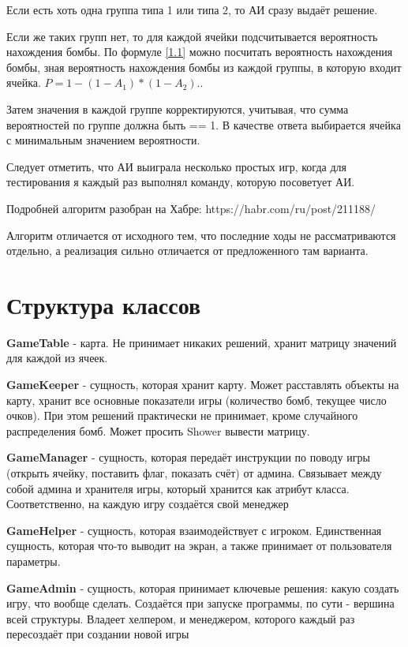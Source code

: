 \documentclass[a4paper,14pt, unknownkeysallowed]{extreport}
\begin{document}
Если есть хоть одна группа типа 1 или типа 2, то АИ сразу выдаёт решение.

Если же таких групп нет, то для каждой ячейки подсчитывается вероятность нахождения бомбы.
По формуле \ref{1.1} можно посчитать вероятность нахождения бомбы, зная вероятность нахождения бомбы из каждой группы, в которую входит ячейка.
\begin{math}
	\label{1.1}
	P = 1 - (1 - A_1) * (1 - A_2)..
\end{math}

Затем значения в каждой группе корректируются, учитывая, что сумма вероятностей по группе должна быть == 1.
В качестве ответа выбирается ячейка с минимальным значением вероятности.

Следует отметить, что АИ выиграла несколько простых игр, когда для тестирования я каждый раз выполнял команду, которую посоветует АИ.

Подробней алгоритм разобран на Хабре: https://habr.com/ru/post/211188/

Алгоритм отличается от исходного тем, что последние ходы не рассматриваются отдельно, а реализация сильно отличается от предложенного там варианта. 

\chapter{Структура классов}

\textbf{GameTable} - карта. Не принимает никаких решений, хранит матрицу значений для каждой из ячеек.

\textbf{GameKeeper} - сущность, которая хранит карту. Может расставлять объекты на карту, 
хранит все основные показатели игры (количество бомб, текущее число очков). При этом решений практически не принимает, 
кроме случайного распределения бомб. Может просить Shower вывести матрицу.

\textbf{GameManager} - сущность, которая передаёт инструкции по поводу игры (открыть ячейку, поставить флаг, показать счёт) от админа.
Связывает между собой админа и хранителя игры, который хранится как атрибут класса. 
Соответственно, на каждую игру создаётся свой менеджер

\textbf{GameHelper} - сущность, которая взаимодействует с игроком. Единственная сущность, которая что-то выводит на экран, а также принимает от пользователя параметры.

\textbf{GameAdmin} - сущность, которая принимает ключевые решения: какую создать игру, что вообще сделать. 
Создаётся при запуске программы, по сути - вершина всей структуры.
Владеет хелпером, и менеджером, которого каждый раз пересоздаёт при создании новой игры
\end{document}

